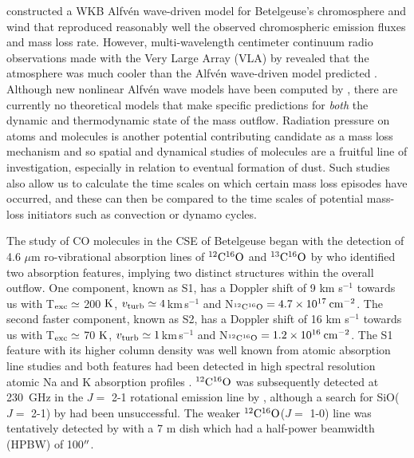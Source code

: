\documentclass[iop]{emulateapj}
\begin{document}
\cite{1984ApJ...284..238H} constructed a WKB Alfv\'{e}n wave-driven model for Betelgeuse's chromosphere and wind that reproduced reasonably well the observed chromospheric emission fluxes and mass loss rate. However, multi-wavelength centimeter continuum radio observations made with the Very Large Array (VLA) by \cite{1998Natur.392..575L} revealed that the atmosphere was much cooler than the Alfv\'{e}n wave-driven model predicted \citep{harper_2001}. Although  new nonlinear Alfv\'{e}n wave models have been computed by \cite{2000ApJ...528..965A}, there are currently no theoretical models that make specific predictions for {\em both} the dynamic and thermodynamic state of the mass outflow. Radiation pressure on atoms and molecules is another potential contributing candidate as a mass loss mechanism and so spatial and dynamical studies of molecules are a fruitful line of investigation, especially in relation to eventual formation of dust. Such studies also allow us to calculate the time scales on which certain mass loss episodes have occurred, and these can then be compared to the time scales of potential mass-loss initiators such as convection or dynamo cycles.

The study of CO molecules in the CSE of Betelgeuse began with the detection of 4.6 $\mu$m ro-vibrational absorption lines of $\rm{{}^{12}C^{16}O}$ and $\rm{{}^{13}C^{16}O}$ by \cite{1979ApJ...233L.135B} who identified two absorption features, implying two distinct structures within the overall outflow. One component, known as S1, has a Doppler shift of 9 km s${}^{-1}$ towards us with T$_{\rm{exc}} \simeq$ 200 $\rm{K}$, $v_{\rm{turb}}\simeq 4$\,km\,s${}^{-1}$ and N$_{\rm{^{12}C^{16}O}}=4.7\times 10^{17}\>{\rm cm}^{-2}$. The second faster component, known as S2, has a Doppler shift of 16 km s${}^{-1}$ towards us with T$_{\rm{exc}} \simeq$ 70 $\rm{K}$, $v_{\rm{turb}}\simeq 1$\,km\,s${}^{-1}$ and N$_{\rm{^{12}C^{16}O}}=1.2\times 10^{16}\>{\rm cm}^{-2}$. The S1 feature with its higher column density was well known from atomic absorption line studies \citep[e.g.][]{1962ApJ...136..844W} and both features had been detected in high spectral resolution atomic Na and K absorption profiles \citep{1975ApJ...199..427G}. $\rm{{}^{12}C^{16}O}$ was subsequently detected at 230~GHz in the $J=$ 2-1 rotational emission line by \cite{1980ApJ...242L..25K}, although a search for SiO($J=$ 2-1) by \cite{1978ApJ...221..854L} had been unsuccessful. The weaker $\rm{{}^{12}C^{16}O}$($J=$ 1-0) line was tentatively detected by \cite{1985ApJ...292..640K} with a 7 m dish which had a half-power beamwidth (HPBW) of 100$\mbox{$^{\prime\prime}$}$.
\end{document}
